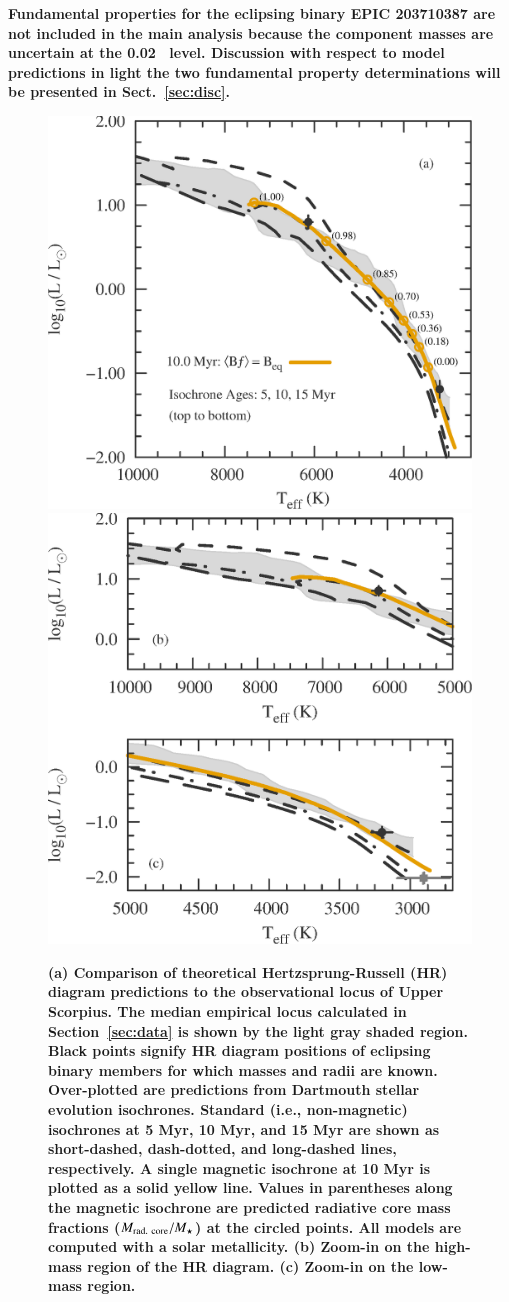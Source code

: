 \documentclass{aa}
\begin{document}
{\bf Fundamental properties for the eclipsing binary EPIC 203710387 \citep{David2015b, Lodieu2015} are not included in the main analysis because the component masses are uncertain at the 0.02 \msun\ level. Discussion with respect to model predictions in light the two fundamental property determinations will be presented in Sect.~\ref{sec:disc}.}

\begin{figure}[t]
    \centering
    \includegraphics[width=0.48\linewidth]{HR_diagram_age_USco.eps} \quad
    \includegraphics[width=0.43\linewidth]{HR_diagram_split_USco.eps}
    \caption{{\bf (a) Comparison of theoretical Hertzsprung-Russell (HR) diagram predictions to the observational locus of Upper Scorpius. The median empirical locus calculated in Section~\ref{sec:data} is shown by the light gray shaded region. Black points signify HR diagram positions of eclipsing binary members for which masses and radii are known. Over-plotted are predictions from Dartmouth stellar evolution isochrones. Standard (i.e., non-magnetic) isochrones at 5 Myr, 10 Myr, and 15 Myr are shown as short-dashed, dash-dotted, and long-dashed lines, respectively. A single magnetic isochrone at 10 Myr is plotted as a solid yellow line. Values in parentheses along the magnetic isochrone are predicted radiative core mass fractions ($M_{\rm rad.\ core}/M_{\star}$) at the circled points. All models are computed with a solar metallicity. (b) Zoom-in on the high-mass region of the HR diagram. (c) Zoom-in on the low-mass region.}}
    \label{fig:ages}
\end{figure}
\end{document}
